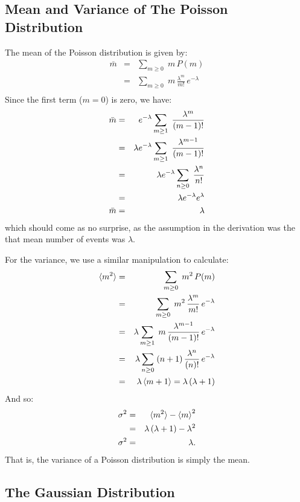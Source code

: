 \documentclass[12pt]{article}
\begin{document}
\subsection{Mean and Variance of The Poisson Distribution}

The mean of the Poisson distribution is given by:
\begin{eqnarray*}
\bar{m} &=& \sum_{m \geq 0} \; m \, P(m) \\
&=& \sum_{m \geq 0} \; m \, \frac{\lambda^m}{m!} \, e^{-\lambda}\\
\end{eqnarray*}
Since the first term ($m=0$) is zero, we have:
\begin{eqnarray}
\bar{m} &=& e^{-\lambda} \sum_{m \geq 1} \; \frac{\lambda^m}{(m-1)!} \notag \\
             &=& \lambda e^{-\lambda} \sum_{m \geq 1} \; \frac{\lambda^{m-1}}{(m-1)!} \notag \\
             &=& \lambda e^{-\lambda} \sum_{n \geq 0} \; \frac{\lambda^{n}}{n!} \notag \\
             &=& \lambda e^{-\lambda} e^\lambda \notag \\
\bar{m}  &=& \lambda
\end{eqnarray}
which should come as no surprise, as the assumption in the derivation was the that mean number of events was $\lambda$.

For the variance, we use a similar manipulation to calculate:
\begin{eqnarray*}
\braket{m^2} &=& \sum_{m \geq 0} \; m^2 \, P(m) \\
&=& \sum_{m \geq 0} \; m^2 \, \frac{\lambda^m}{m!} \, e^{-\lambda}\\
&=& \lambda \sum_{m \geq 1} \; m \, \frac{\lambda^{m-1}}{(m-1)!} \, e^{-\lambda}\\
&=& \lambda \sum_{n \geq 0} \; (n+1) \, \frac{\lambda^{n}}{(n)!} \, e^{-\lambda}\\
&=& \lambda \braket{m+1} = \lambda \, (\lambda+1)
\end{eqnarray*}
And so:
\begin{eqnarray}
\sigma^2 &=& \braket{m^2} - \braket{m}^2 \notag \\
&=& \lambda \, (\lambda+1) - \lambda^2 \notag \\
\sigma^2 &=& \lambda. 
\end{eqnarray}
That is, the variance of a Poisson distribution is simply the mean.

\subsection{The Gaussian Distribution}
\end{document}
